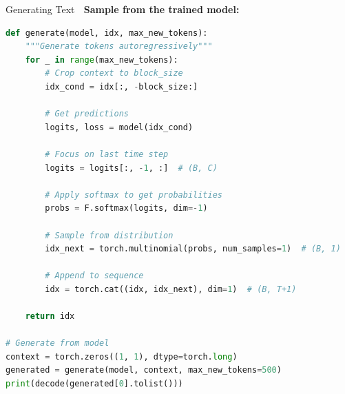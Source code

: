\documentclass[aspectratio=169]{beamer}
\begin{document}
\begin{frame}[fragile]{Generating Text 📝}
\textbf{Sample from the trained model:}

\begin{lstlisting}[language=Python]
def generate(model, idx, max_new_tokens):
    """Generate tokens autoregressively"""
    for _ in range(max_new_tokens):
        # Crop context to block_size
        idx_cond = idx[:, -block_size:]

        # Get predictions
        logits, loss = model(idx_cond)

        # Focus on last time step
        logits = logits[:, -1, :]  # (B, C)

        # Apply softmax to get probabilities
        probs = F.softmax(logits, dim=-1)

        # Sample from distribution
        idx_next = torch.multinomial(probs, num_samples=1)  # (B, 1)

        # Append to sequence
        idx = torch.cat((idx, idx_next), dim=1)  # (B, T+1)

    return idx

# Generate from model
context = torch.zeros((1, 1), dtype=torch.long)
generated = generate(model, context, max_new_tokens=500)
print(decode(generated[0].tolist()))
\end{lstlisting}
\end{frame}
\end{document}
